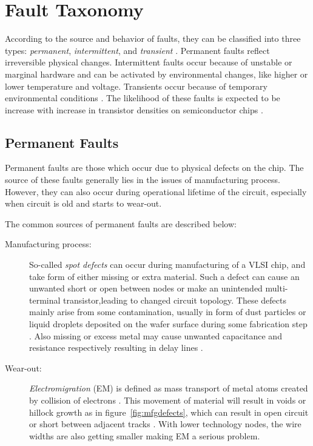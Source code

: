 \section{Fault Taxonomy}
\label{sec:secft}
According to the source and behavior of faults, they can be classified into three types: \emph{permanent}, \emph{intermittent}, and \emph{transient} \cite{Constantinescu2003}. Permanent faults reflect irreversible physical changes. Intermittent faults occur because of unstable or marginal hardware and can be activated by environmental changes, like higher or lower temperature and voltage. Transients occur because of temporary environmental conditions \cite{Constantinescu2003}. The likelihood of these faults is expected to be increase with increase in transistor densities on semiconductor chips \cite{Constantinescu2007}.

\subsection{Permanent Faults}
Permanent faults are those which occur due to physical defects on the chip. The source of these faults generally lies in the issues of manufacturing process. However, they can also occur during operational lifetime of the circuit, especially when circuit is old and starts to wear-out.

The common sources of permanent faults are described below:
\begin{description}
\item[Manufacturing process:] So-called \emph{spot defects} can occur during manufacturing of a VLSI chip, and take form of either missing or extra material. Such a defect can cause an unwanted short or open between nodes or make an unintended multi-terminal transistor,leading to changed circuit topology. These defects mainly arise from some contamination, usually in form of dust particles or liquid droplets deposited on the wafer surface during some fabrication step \cite{Khare1996}. Also missing or excess metal may cause unwanted capacitance and resistance respectively resulting in delay lines \cite{Wagner1995}.

\item[Wear-out:] \emph{Electromigration} (EM) is defined as mass transport of metal atoms created by collision of electrons \cite{Ghate1982}. This movement of material will result in voids or hillock growth as in figure~\ref{fig:mfgdefects}, which can result in open circuit or short between adjacent tracks \cite{AnalogDevices2000}. With lower technology nodes, the wire widths are also getting smaller making EM a serious problem.
\end{description}

